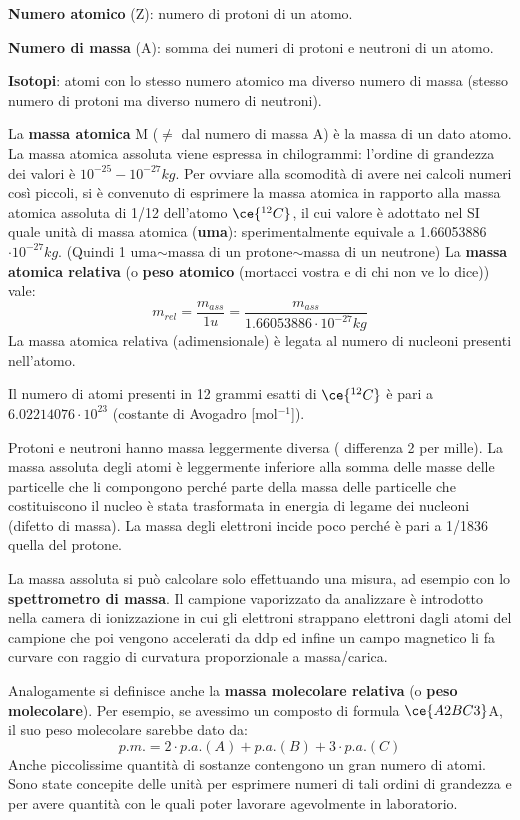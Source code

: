 \textbf{Numero atomico} (Z): numero di protoni di un atomo.

\textbf{Numero di massa} (A): somma dei numeri di protoni e neutroni di un
atomo.

\textbf{Isotopi}: atomi con lo stesso numero atomico ma diverso numero di
massa (stesso numero di protoni ma diverso numero di neutroni).

La \textbf{massa atomica} M ($\neq$ dal numero di massa A) è la massa di un dato atomo. La massa atomica assoluta viene espressa in chilogrammi: l'ordine di grandezza dei valori è $10^{-25}-10^{-27} kg$. Per ovviare alla scomodità di avere nei calcoli numeri così piccoli, si è convenuto di esprimere la
massa atomica in rapporto alla massa atomica assoluta di 1/12 dell'atomo \(\ce{ ^{12}C }\), il cui valore è adottato nel SI quale unità di massa atomica (\textbf{uma}): sperimentalmente equivale a 1.66053886$\cdot
10^{-27} kg$. (Quindi 1 uma$\sim$massa di un protone$\sim$massa di un neutrone)
La \textbf{massa atomica relativa} (o \textbf{peso atomico} (mortacci vostra e di chi non ve lo dice)) vale:
$$m_{rel}=\frac{m_{ass}}{1 u}=\frac{m_{ass}}{1.66053886\cdot
10^{-27} kg}$$
La massa atomica relativa (adimensionale) è legata al numero di nucleoni presenti nell'atomo.

Il numero di atomi presenti in 12 grammi esatti di \(\ce{ ^{12}C }\) è pari a $6.02214076\cdot10^{23}$ (costante di Avogadro [mol$^{-1}$]).

Protoni e neutroni hanno massa leggermente diversa ( differenza 2 per mille). La massa assoluta degli atomi è leggermente inferiore alla somma delle masse delle particelle che li compongono perché parte della massa delle particelle che costituiscono il nucleo è stata trasformata in energia di legame dei nucleoni (difetto di massa).
La massa degli elettroni incide poco perché è pari a 1/1836 quella del protone.

La massa assoluta si può calcolare solo effettuando una misura, ad esempio con lo \textbf{spettrometro di massa}. Il campione vaporizzato da analizzare è introdotto nella camera di ionizzazione in cui gli elettroni strappano elettroni dagli atomi del campione che poi vengono accelerati da ddp ed infine un campo magnetico li fa curvare con raggio di curvatura proporzionale a massa/carica.

Analogamente si definisce anche la \textbf{massa molecolare relativa} (o \textbf{peso molecolare}). Per esempio, se avessimo un composto di formula \(\ce{ A2BC3 }\)A, il suo peso molecolare sarebbe dato da:
$$p.m.= 2\cdot p.a.(A) + p.a.(B)+ 3\cdot p.a.(C)$$
Anche piccolissime quantità di sostanze contengono un gran numero di atomi.
Sono state concepite delle unità per esprimere numeri di tali ordini di grandezza e per avere quantità con le quali poter lavorare agevolmente in laboratorio.

